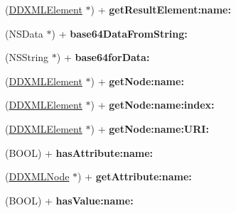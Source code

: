 \begin{DoxyCompactItemize}
\item 
\hypertarget{interface_helper_a17acf5aa964909e728a7fd09a4f32bb4}{}(\hyperlink{interface_d_d_x_m_l_element}{D\+D\+X\+M\+L\+Element} $\ast$) + {\bfseries get\+Result\+Element\+:name\+:}\label{interface_helper_a17acf5aa964909e728a7fd09a4f32bb4}

\item 
\hypertarget{interface_helper_a1af15100dd061aceef149ba8d289b9c1}{}(N\+S\+Data $\ast$) + {\bfseries base64\+Data\+From\+String\+:}\label{interface_helper_a1af15100dd061aceef149ba8d289b9c1}

\item 
\hypertarget{interface_helper_a57462e509f168213a9cd649d2f6a70a1}{}(N\+S\+String $\ast$) + {\bfseries base64for\+Data\+:}\label{interface_helper_a57462e509f168213a9cd649d2f6a70a1}

\item 
\hypertarget{interface_helper_a6a9dab5d38044c6ab9f9240d6433305f}{}(\hyperlink{interface_d_d_x_m_l_element}{D\+D\+X\+M\+L\+Element} $\ast$) + {\bfseries get\+Node\+:name\+:}\label{interface_helper_a6a9dab5d38044c6ab9f9240d6433305f}

\item 
\hypertarget{interface_helper_a9b052bdacb589519f1bb1acec1de9f8d}{}(\hyperlink{interface_d_d_x_m_l_element}{D\+D\+X\+M\+L\+Element} $\ast$) + {\bfseries get\+Node\+:name\+:index\+:}\label{interface_helper_a9b052bdacb589519f1bb1acec1de9f8d}

\item 
\hypertarget{interface_helper_a8520641943aed4e4233a7337800744be}{}(\hyperlink{interface_d_d_x_m_l_element}{D\+D\+X\+M\+L\+Element} $\ast$) + {\bfseries get\+Node\+:name\+:\+U\+R\+I\+:}\label{interface_helper_a8520641943aed4e4233a7337800744be}

\item 
\hypertarget{interface_helper_a988e89e5fbf0b2742ddfbb97ba2bdf98}{}(B\+O\+O\+L) + {\bfseries has\+Attribute\+:name\+:}\label{interface_helper_a988e89e5fbf0b2742ddfbb97ba2bdf98}

\item 
\hypertarget{interface_helper_ae5c90f9c508031fc02b7f6395de21a97}{}(\hyperlink{interface_d_d_x_m_l_node}{D\+D\+X\+M\+L\+Node} $\ast$) + {\bfseries get\+Attribute\+:name\+:}\label{interface_helper_ae5c90f9c508031fc02b7f6395de21a97}

\item 
\hypertarget{interface_helper_af8ce7d7d5b9b33ef6802fe2a2e561580}{}(B\+O\+O\+L) + {\bfseries has\+Value\+:name\+:}\label{interface_helper_af8ce7d7d5b9b33ef6802fe2a2e561580}


\end{DoxyCompactItemize}
